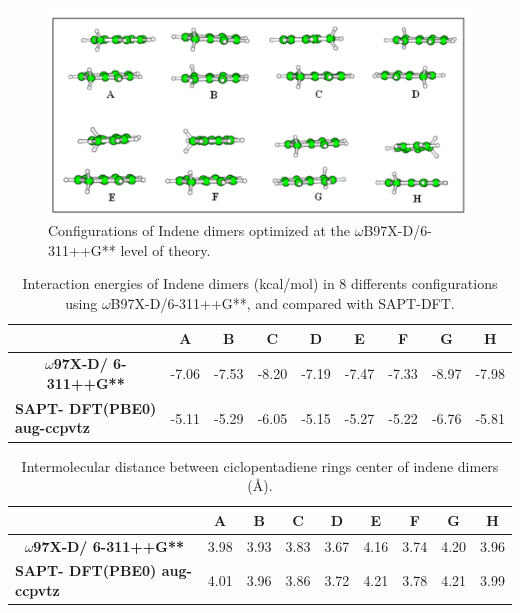 \begin{figure}[H]
	\begin{center}
		\includegraphics[scale=0.8]{anex/image/Ind-dim}
	\end{center}
	\caption{Configurations of Indene dimers optimized at the $\omega$B97X-D/6-311++G** level of theory.}
\end{figure}



\begin{table}[htbp]
	\caption{Interaction energies of Indene dimers (kcal/mol) in 8 differents configurations using $\omega$B97X-D/6-311++G**, and compared with SAPT-DFT.}
	\begin{tabular}{ccccccccc}
		\toprule
		& \textbf{A} & \textbf{B} & \textbf{C} & \textbf{D} & \textbf{E} & \textbf{F} & \textbf{G} & \textbf{H} \\ 
		\midrule
		\textbf{$\omega$97X-D/
		6-311++G** }& -7.06 & -7.53 & -8.20 & -7.19 & -7.47 & -7.33 & -8.97 & -7.98 \\ 
		\multicolumn{1}{l}{\textbf{SAPT- DFT(PBE0)
				aug-ccpvtz 
			}} & -5.11 & -5.29 & -6.05 & -5.15 & -5.27 & -5.22 & -6.76 & -5.81 \\
			\bottomrule 
		\end{tabular}
		\label{}
	\end{table}
	
	
	

\begin{table}[htbp]
	\caption{Intermolecular distance between ciclopentadiene rings center of  indene dimers (Å). }
	\begin{tabular}{ccccccccc}
		\toprule
		& \textbf{A} & \textbf{B} & \textbf{C} & \textbf{D} & \textbf{E} & \textbf{F} & \textbf{G} & \textbf{H} \\ 
		\midrule
		\textbf{$\omega$97X-D/
			6-311++G** }& 3.98 &3.93 &3.83 &3.67 &4.16 & 3.74 &4.20 &3.96 \\ 
		\multicolumn{1}{l}{\textbf{SAPT- DFT(PBE0)
				aug-ccpvtz 
			}} & 4.01 & 3.96 &3.86 &3.72 &4.21 & 3.78 &4.21 &3.99\\
			\bottomrule 
		\end{tabular}
		\label{}
	\end{table}


